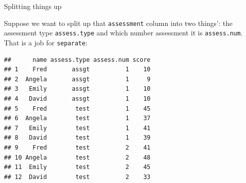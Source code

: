 \begin{frame}[fragile]{Splitting things up}
  
Suppose we want to split up that \texttt{assessment} column into two
things': the assessment type \texttt{assess.type} and which number
assessment it is \texttt{assess.num}. That is a job for \texttt{separate}:

{\footnotesize
\begin{knitrout}
\color{fgcolor}\begin{kframe}
\begin{alltt}
\hlstd{=}\hlstd{(}\hlstd{,}\hlstd{),}
         \hlstd{=}\hlstd{)}
\end{alltt}
\begin{verbatim}
##      name assess.type assess.num score
## 1    Fred       assgt          1    10
## 2  Angela       assgt          1     9
## 3   Emily       assgt          1    10
## 4   David       assgt          1    10
## 5    Fred        test          1    45
## 6  Angela        test          1    37
## 7   Emily        test          1    41
## 8   David        test          1    39
## 9    Fred        test          2    41
## 10 Angela        test          2    48
## 11  Emily        test          2    45
## 12  David        test          2    33
\end{verbatim}
\end{kframe}
\end{knitrout}
}
  
\end{frame}


